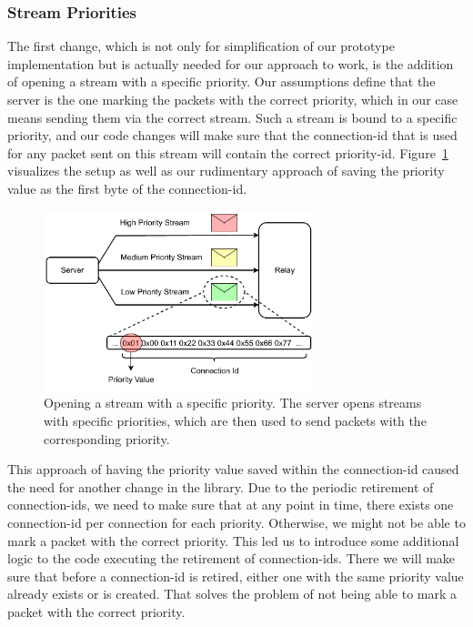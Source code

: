 \subsubsection*{Stream Priorities}
The first change, which is not only for simplification of our prototype implementation but is actually needed for 
our approach to work, is the addition of opening a stream with a specific priority.
Our assumptions define that the server is the one marking the packets with the correct priority, which in 
our case means sending them via the correct stream.
Such a stream is bound to a specific priority, and our code changes will make sure that the connection-id
that is used for any packet sent on this stream will contain the correct priority-id.
Figure~\ref{fig:priority-stream} visualizes the setup as well as our rudimentary approach of saving the 
priority value as the first byte of the connection-id.

\vspace{0.5cm}
\begin{figure}[H]
    \centering
    \includegraphics[width=0.7\textwidth]{figures/03_fast_relays/priority-streams.drawio.pdf}
    \caption[Opening a stream with a specific priority]{Opening a stream with a specific priority.
    The server opens streams with specific priorities, which are then used to send packets with the 
    corresponding priority.}\label{fig:priority-stream}
\end{figure}

This approach of having the priority value saved within the connection-id caused the need for another 
change in the library.
Due to the periodic retirement of connection-ids, we need to make sure that at any point in time, there 
exists one connection-id per connection for each priority.
Otherwise, we might not be able to mark a packet with the correct priority.
This led us to introduce some additional logic to the code executing the retirement of connection-ids.
There we will make sure that before a connection-id is retired, either one with the same priority value
already exists or is created.
That solves the problem of not being able to mark a packet with the correct priority.

